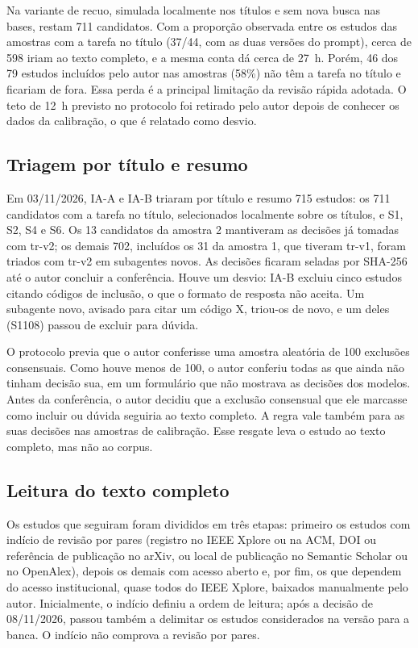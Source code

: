 Na variante de recuo, simulada localmente nos títulos e sem nova busca nas bases, restam 711 candidatos. Com a
proporção observada entre os estudos das amostras com a tarefa no título (37/44, com as duas versões do prompt),
cerca de 598 iriam ao texto completo, e a mesma conta dá cerca de 27~h. Porém, 46 dos 79 estudos incluídos pelo
autor nas amostras (58\%) não têm a tarefa no título e ficariam de fora. Essa perda é a principal limitação da revisão rápida adotada. O teto de 12~h previsto no protocolo foi retirado pelo autor depois de conhecer os
dados da calibração, o que é relatado como desvio.

\subsection{Triagem por título e resumo}\label{sec:lote}
Em 03/11/2026, IA-A e IA-B triaram por título e resumo 715 estudos: os 711 candidatos com a tarefa no
título, selecionados localmente sobre os títulos, e S1, S2, S4 e S6. Os 13 candidatos da amostra 2 mantiveram
as decisões já tomadas com tr-v2; os demais 702, incluídos os 31 da amostra 1, que tiveram tr-v1, foram triados
com tr-v2 em subagentes novos. As decisões ficaram seladas por SHA-256 até o autor concluir a conferência. Houve um
desvio: IA-B excluiu cinco estudos citando códigos de inclusão, o que o formato de resposta não aceita. Um subagente
novo, avisado para citar um código X, triou-os de novo, e um deles (S1108) passou de excluir para dúvida.

O protocolo previa que o autor conferisse uma amostra aleatória de 100 exclusões consensuais. Como houve menos
de 100, o autor conferiu todas as que ainda não tinham decisão sua, em um formulário que não mostrava as decisões
dos modelos. Antes da conferência, o autor decidiu que a exclusão consensual que ele marcasse como incluir ou
dúvida seguiria ao texto completo. A regra vale também para as suas decisões nas amostras de calibração. Esse
resgate leva o estudo ao texto completo, mas não ao corpus.

\subsection{Leitura do texto completo}\label{sec:textocompleto}
Os estudos que seguiram foram divididos em três etapas: primeiro os estudos com indício de revisão por pares
(registro no IEEE Xplore ou na ACM, DOI ou referência de publicação no arXiv, ou local de publicação no Semantic
Scholar ou no OpenAlex), depois os demais com acesso aberto e, por fim, os que dependem do acesso institucional,
quase todos do IEEE Xplore, baixados manualmente pelo autor. Inicialmente, o indício definiu a ordem de leitura; após
a decisão de 08/11/2026, passou também a delimitar os estudos considerados na versão para a banca. O indício não
comprova a revisão por pares.

